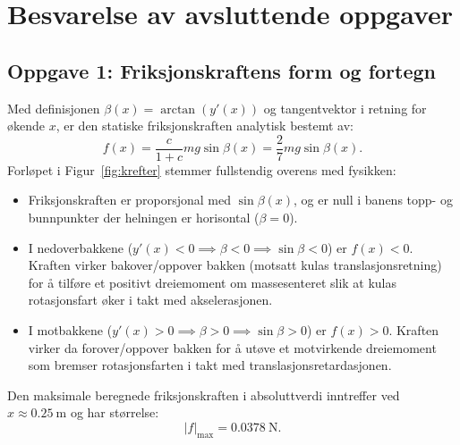 \documentclass[11pt,a4paper]{article}
\begin{document}
\section{Besvarelse av avsluttende oppgaver}

\subsection*{Oppgave 1: Friksjonskraftens form og fortegn}
Med definisjonen $\beta(x) = \arctan(y'(x))$ og tangentvektor i retning for økende $x$, er den statiske friksjonskraften analytisk bestemt av:
\begin{equation}
    f(x) = \frac{c}{1 + c}mg\sin\beta(x) = \frac{2}{7}mg\sin\beta(x).
    \tag{S1}
\end{equation}
Forløpet i Figur~\ref{fig:krefter} stemmer fullstendig overens med fysikken:
\begin{itemize}
    \item Friksjonskraften er proporsjonal med $\sin\beta(x)$, og er null i banens topp- og bunnpunkter der helningen er horisontal ($\beta = 0$).
    \item I nedoverbakkene ($y'(x) < 0 \implies \beta < 0 \implies \sin\beta < 0$) er $f(x) < 0$. Kraften virker bakover/oppover bakken (motsatt kulas translasjonsretning) for å tilføre et positivt dreiemoment om massesenteret slik at kulas rotasjonsfart øker i takt med akselerasjonen.
    \item I motbakkene ($y'(x) > 0 \implies \beta > 0 \implies \sin\beta > 0$) er $f(x) > 0$. Kraften virker da forover/oppover bakken for å utøve et motvirkende dreiemoment som bremser rotasjonsfarten i takt med translasjonsretardasjonen.
\end{itemize}
Den maksimale beregnede friksjonskraften i absoluttverdi inntreffer ved $x \approx \SI{0,25}{\meter}$ og har størrelse:
\begin{equation*}
    |f|_{\max} = \SI{0,0378}{\newton}.
\end{equation*}
\end{document}
